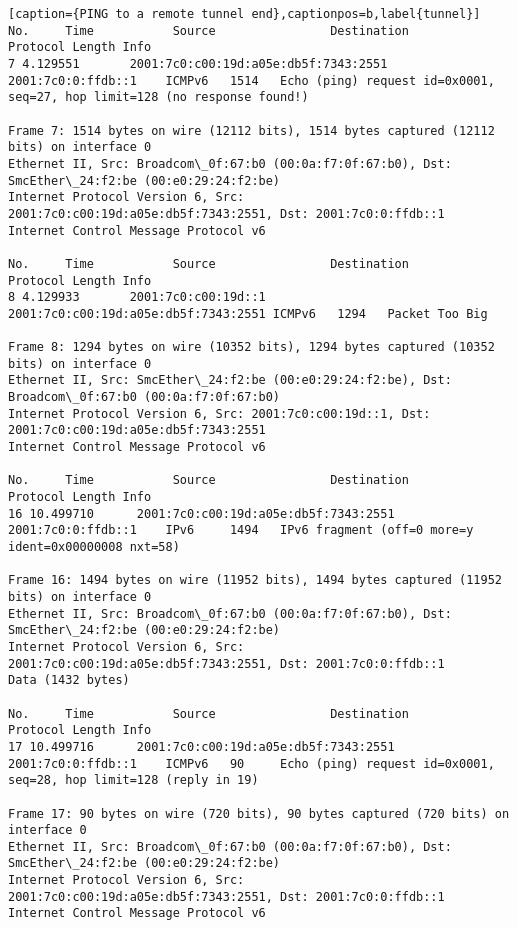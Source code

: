 \begin{lstlisting}[caption={PING to a remote tunnel end},captionpos=b,label{tunnel}]
No.     Time           Source                Destination           Protocol Length Info
7 4.129551       2001:7c0:c00:19d:a05e:db5f:7343:2551 2001:7c0:0:ffdb::1    ICMPv6   1514   Echo (ping) request id=0x0001, seq=27, hop limit=128 (no response found!)

Frame 7: 1514 bytes on wire (12112 bits), 1514 bytes captured (12112 bits) on interface 0
Ethernet II, Src: Broadcom\_0f:67:b0 (00:0a:f7:0f:67:b0), Dst: SmcEther\_24:f2:be (00:e0:29:24:f2:be)
Internet Protocol Version 6, Src: 2001:7c0:c00:19d:a05e:db5f:7343:2551, Dst: 2001:7c0:0:ffdb::1
Internet Control Message Protocol v6

No.     Time           Source                Destination           Protocol Length Info
8 4.129933       2001:7c0:c00:19d::1   2001:7c0:c00:19d:a05e:db5f:7343:2551 ICMPv6   1294   Packet Too Big

Frame 8: 1294 bytes on wire (10352 bits), 1294 bytes captured (10352 bits) on interface 0
Ethernet II, Src: SmcEther\_24:f2:be (00:e0:29:24:f2:be), Dst: Broadcom\_0f:67:b0 (00:0a:f7:0f:67:b0)
Internet Protocol Version 6, Src: 2001:7c0:c00:19d::1, Dst: 2001:7c0:c00:19d:a05e:db5f:7343:2551
Internet Control Message Protocol v6

No.     Time           Source                Destination           Protocol Length Info
16 10.499710      2001:7c0:c00:19d:a05e:db5f:7343:2551 2001:7c0:0:ffdb::1    IPv6     1494   IPv6 fragment (off=0 more=y ident=0x00000008 nxt=58)

Frame 16: 1494 bytes on wire (11952 bits), 1494 bytes captured (11952 bits) on interface 0
Ethernet II, Src: Broadcom\_0f:67:b0 (00:0a:f7:0f:67:b0), Dst: SmcEther\_24:f2:be (00:e0:29:24:f2:be)
Internet Protocol Version 6, Src: 2001:7c0:c00:19d:a05e:db5f:7343:2551, Dst: 2001:7c0:0:ffdb::1
Data (1432 bytes)

No.     Time           Source                Destination           Protocol Length Info
17 10.499716      2001:7c0:c00:19d:a05e:db5f:7343:2551 2001:7c0:0:ffdb::1    ICMPv6   90     Echo (ping) request id=0x0001, seq=28, hop limit=128 (reply in 19)

Frame 17: 90 bytes on wire (720 bits), 90 bytes captured (720 bits) on interface 0
Ethernet II, Src: Broadcom\_0f:67:b0 (00:0a:f7:0f:67:b0), Dst: SmcEther\_24:f2:be (00:e0:29:24:f2:be)
Internet Protocol Version 6, Src: 2001:7c0:c00:19d:a05e:db5f:7343:2551, Dst: 2001:7c0:0:ffdb::1
Internet Control Message Protocol v6


\end{lstlisting}
